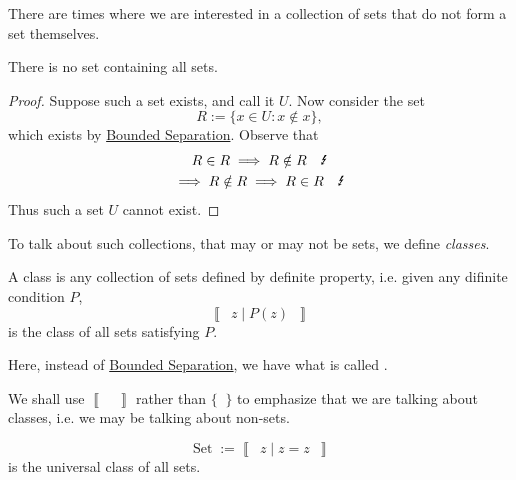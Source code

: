 \documentclass[notoc,notitlepage]{tufte-book}
\newcommand{\class}[1]{\left\llbracket \enspace #1 \enspace \right\rrbracket}
\DeclareMathOperator{\Set}{Set }
\begin{document}
There are times where we are interested in a collection of sets that do not form a set themselves.

\begin{eg}
  There is no set containing all sets.

  \begin{proof}
    Suppose such a set exists, and call it $U$. Now consider the set
    \begin{equation*}
      R := \{ x \in U : x \notin x \},
    \end{equation*}
    which exists by \hyperref[axiom:bounded_separation_axiom]{Bounded Separation}. Observe that
    \begin{gather*}
      R \in R \implies R \notin R \quad \text{\Lightning} \\
      \implies R \notin R \implies R \in R \quad \text{\Lightning}
    \end{gather*}
    Thus such a set $U$ cannot exist.
  \end{proof}
\end{eg}

To talk about such collections, that may or may not be sets, we define \textit{classes}.

\begin{defn}[Class]
\label{defn:class}
  A class is any collection of sets defined by definite property, i.e. given any difinite condition $P$,
  \begin{equation*}
    \class{ z \mid P(z) }
  \end{equation*}
  is the class of all sets satisfying $P$.
\end{defn}

Here, instead of \hyperref[axiom:bounded_separation_axiom]{Bounded Separation}, we have what is called .

\begin{note}
  We shall use $\class{}$ rather than $\{ \; \; \}$ to emphasize that we are talking about classes, i.e. we may be talking about non-sets.
\end{note}

\begin{eg}
  \begin{equation*}
    \Set := \class{ z \mid z = z }
  \end{equation*}
  is the universal class of all sets.
\end{eg}
\end{document}
